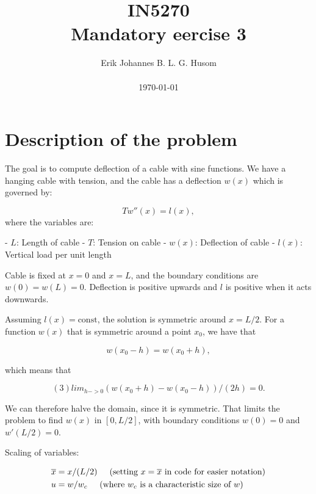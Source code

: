 \documentclass[10pt, a4paper]{amsart}
\title[Mandatory exercise 3]{IN5270 \\ \large
Mandatory eercise 3}
\author[Husom]{Erik Johannes B. L. G. Husom \\ \\ \today}
\numberwithin{figure}{section}
\numberwithin{table}{section}
\begin{document}
\maketitle


\tableofcontents


\section{Description of the problem}


The goal is to compute deflection of a cable with sine functions. We have a hanging cable
with tension, and the cable has a deflection $w(x)$ which is governed by:

\begin{equation}
    Tw''(x) = l(x),
\end{equation}
where the variables are:

- $L$: Length of cable
- $T$: Tension on cable
- $w(x)$: Deflection of cable
- $l(x)$: Vertical load per unit length

Cable is fixed at $x = 0$ and $x = L$, and the boundary conditions are $w(0) = w(L) = 0$. Deflection 
is positive upwards and $l$ is positive when it acts downwards.

Assuming $l(x) = \text{const}$, the solution is symmetric around $x = L/2$. For a
function $w(x)$ that is symmetric around a point $x_0$, we have that

\begin{equation}
w(x_0 - h) = w(x_0 + h),
\end{equation}

which means that

\begin{equation}
(3) lim_{h->0} (w(x_0+h) - w(x_0 - h))/(2h) = 0.
\end{equation}

We can therefore halve the domain, since it is symmetric. That limits the
problem to find $w(x)$ in $[0, L/2]$, with boundary conditions $w(0) = 0$
and $w'(L/2) = 0$.

Scaling of variables:

\begin{align}
    \overline{x} &= x/(L/2)  \hspace{0.5cm}    \text{(setting $x =
    \overline{x}$ in code for easier notation)}\\
    u &= w/w_c \hspace{0.5cm} \text{(where $w_c$ is a characteristic size of $w$)}
\end{align}
\end{document}

